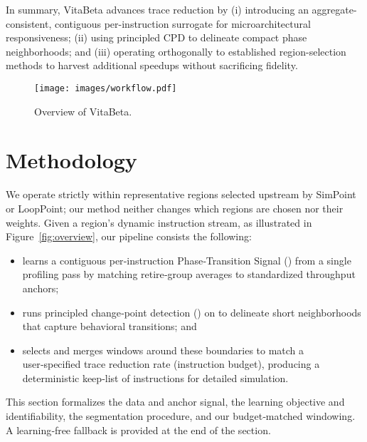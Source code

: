 
In summary, VitaBeta advances trace reduction by (i) introducing an aggregate-consistent, contiguous per-instruction surrogate for microarchitectural responsiveness; (ii) using principled CPD to delineate compact phase neighborhoods; and (iii) operating orthogonally to established region-selection methods to harvest additional speedups without sacrificing fidelity.

 
\begin{figure}[!htbp]
\label{fig:overview}
    \centering
    \texttt{[image: images/workflow.pdf]}
    \caption{Overview of VitaBeta.}
    \label{fig:placeholder}
\end{figure}
\section{Methodology}\label{sec:methodology}
We operate strictly within representative regions selected upstream by SimPoint or LoopPoint; our method neither changes which regions are chosen nor their weights. Given a region’s dynamic instruction stream, as illustrated in Figure~\ref{fig:overview}, our pipeline consists the following:

\begin{itemize}
    \item learns a contiguous per‑instruction Phase‑Transition Signal (\pts) from a single profiling pass by matching retire‑group averages to standardized throughput anchors;
    \item runs principled change‑point detection (\cpd) on \pts to delineate short neighborhoods that capture behavioral transitions; and
    \item selects and merges windows around these boundaries to match a user‑specified trace reduction rate (instruction budget), producing a deterministic keep‑list of instructions for detailed simulation.
\end{itemize}
 

This section formalizes the data and anchor signal, the learning objective and identifiability, the segmentation procedure, and our budget‑matched windowing. A learning‑free fallback is provided at the end of the section.

